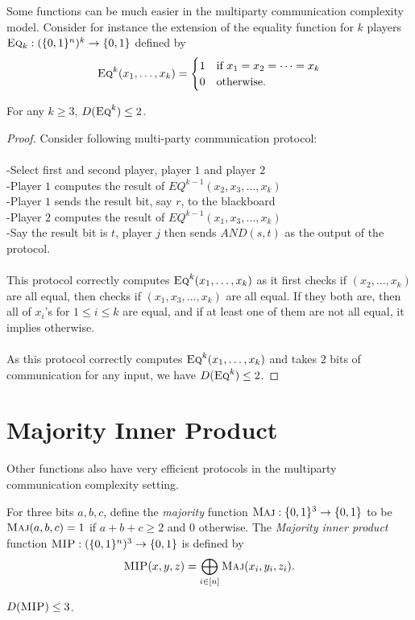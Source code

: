 Some functions can be much easier in the multiparty communication complexity model. Consider for instance the extension of the equality function for $k$ players $\textsc{Eq}_k : (\{0,1\}^n)^k \to \{0,1\}$ defined by
\[
\textsc{Eq}^k(x_1,\ldots,x_k) = \begin{cases}
1 & \mbox{if } x_1 = x_2 = \cdots = x_k \\
0 & \mbox{otherwise.}
\end{cases}
\]
\begin{theorem}
	For any $k \ge 3$, $D(\textsc{Eq}^k) \le 2$.
\end{theorem}

\begin{proof}
	Consider following multi-party communication protocol:\\
	\\
	-Select first and second player, player $1$ and player $2$\\
	-Player $1$ computes the result of $EQ^{k-1}(x_2,x_3,...,x_k)$\\
	-Player $1$ sends the result bit, say $r$, to the blackboard\\
	-Player $2$ computes the result of $EQ^{k-1}(x_1,x_3,...,x_k)$\\
	-Say the result bit is $t$, player $j$ then sends $AND(s,t)$ as the output of the protocol.\\
	\\
	This protocol correctly computes $\textsc{Eq}^k(x_1,\ldots,x_k)$ as it first checks if $(x_2,...,x_k)$ are all equal, then checks if $(x_1,x_3,...,x_k)$ are all equal. If they both are, then all of $x_i$'s for $1 \leq i \leq k$ are equal, and if at least one of them are not all equal, it implies otherwise. \\
	\\
	As this protocol correctly computes $\textsc{Eq}^k(x_1,\ldots,x_k)$ and takes $2$ bits of communication for any input, we have  $D(\textsc{Eq}^k) \le 2$. 
\end{proof}




\section{Majority Inner Product}

Other functions also have very efficient protocols in the multiparty communication complexity setting. 

For three bits $a,b,c$, define the \emph{majority} function $\textsc{Maj} : \{0,1\}^3 \to \{0,1\}$ to be $\textsc{Maj}(a,b,c) = 1$ if $a+b+c \ge 2$ and $0$ otherwise. The \emph{Majority inner product} function $\textsc{MIP} : (\{0,1\}^n)^3 \to \{0,1\}$ is defined by
\[
\textsc{MIP}(x,y,z) = \bigoplus_{i \in [n]} \textsc{Maj}(x_i,y_i,z_i).
\]
\begin{theorem}
	$D(\textsc{MIP}) \le 3$.
\end{theorem}

